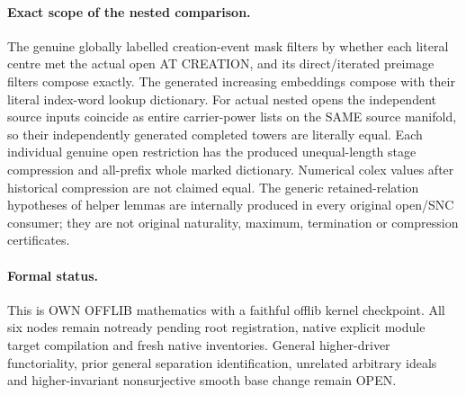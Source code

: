 \paragraph{Exact scope of the nested comparison.}
The genuine globally labelled creation-event mask filters by whether each
literal centre met the actual open AT CREATION, and its direct/iterated
preimage filters compose exactly. The generated increasing embeddings compose
with their literal index-word lookup dictionary. For actual nested opens the
independent source inputs coincide as entire carrier-power lists on the SAME
source manifold, so their independently generated completed towers are
literally equal. Each individual genuine open restriction has the produced
unequal-length stage compression and all-prefix whole marked dictionary.
Numerical colex values after historical compression are not claimed equal.
The generic retained-relation hypotheses of helper lemmas are internally
produced in every original open/SNC consumer; they are not original
naturality, maximum, termination or compression certificates.

\paragraph{Formal status.}
This is OWN OFFLIB mathematics with a faithful offlib kernel checkpoint.
All six nodes remain notready pending root registration, native explicit
module target compilation and fresh native inventories. General higher-driver
functoriality, prior general separation identification, unrelated arbitrary
ideals and higher-invariant nonsurjective smooth base change remain OPEN.
